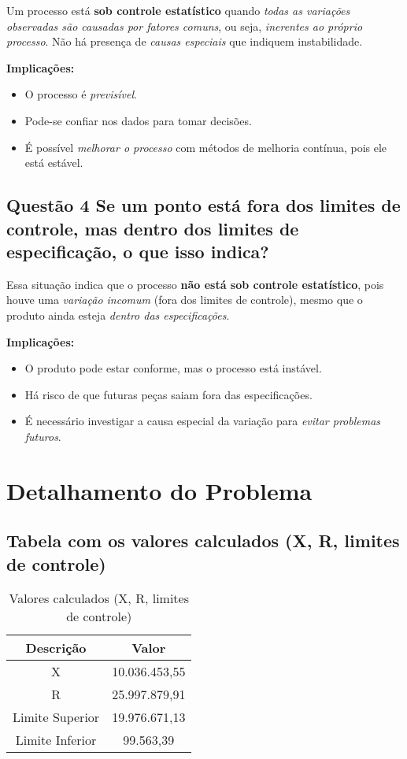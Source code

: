 \documentclass[12pt]{article}
\begin{document}
Um processo está \textbf{sob controle estatístico} quando \textit{todas as variações observadas são causadas por fatores comuns}, ou seja, \textit{inerentes ao próprio processo}. Não há presença de \textit{causas especiais} que indiquem instabilidade.

\textbf{Implicações:}
\begin{itemize}
    \item O processo é \textit{previsível}.
    \item Pode-se confiar nos dados para tomar decisões.
    \item É possível \textit{melhorar o processo} com métodos de melhoria contínua, pois ele está estável.
\end{itemize}

\subsection*{Questão 4 Se um ponto está fora dos limites de controle, mas dentro dos limites de especificação, o que isso indica?}

Essa situação indica que o processo \textbf{não está sob controle estatístico}, pois houve uma \textit{variação incomum} (fora dos limites de controle), mesmo que o produto ainda esteja \textit{dentro das especificações}.

\textbf{Implicações:}
\begin{itemize}
    \item O produto pode estar conforme, mas o processo está instável.
    \item Há risco de que futuras peças saiam fora das especificações.
    \item É necessário investigar a causa especial da variação para \textit{evitar problemas futuros}.
\end{itemize}

\section{Detalhamento do Problema}

\subsection*{Tabela com os valores calculados (X, R, limites de controle)}

\begin{table}[H]
    \centering
    \caption{Valores calculados (X, R, limites de controle)}
    \label{tab:valores_x_r}
    \begin{tabular}{|c|c|}
    \hline
         Descrição & Valor \\ \hline
         X & 10.036.453,55 \\ \hline
         R & 25.997.879,91 \\ \hline
         Limite Superior & 19.976.671,13 \\ \hline
         Limite Inferior & 99.563,39 \\ \hline
     \end{tabular}
\end{table}
\end{document}
